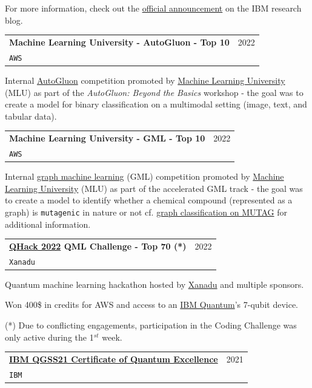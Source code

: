 \documentclass[letterpaper,11pt]{article}
\makeatletter
\newcommand{\resumeSubheading}[4]{
  \vspace{-2pt}\item
    \begin{tabular*}{0.97\textwidth}[t]{l@{\extracolsep{\fill}}r}
      \textbf{#1} & #2 \\
      \texttt{\small#3} & \textit{\small #4} \\
    \end{tabular*}\vspace{-7pt}
}
\makeatother
\begin{document}
    For more information, check out the \href{https://research.ibm.com/blog/quantum-challenge-fall-2022}{official announcement} on the IBM research blog.
    \vspace{2mm}
    \resumeSubheading
      {Machine Learning University - AutoGluon - Top 10}{2022}
      {AWS}{}
    \vspace{3mm}
    
    Internal \href{https://auto.gluon.ai/stable/index.html}{AutoGluon} competition promoted by \href{https://aws.amazon.com/machine-learning/mlu/}{Machine Learning University} (MLU) as part of the \emph{AutoGluon: Beyond the Basics} workshop - the goal was to create a model for binary classification on a multimodal setting (image, text, and tabular data).
    
    \vspace{2mm}
    \resumeSubheading
      {Machine Learning University - GML - Top 10}{2022}
      {AWS}{}
    \vspace{3mm}
    
    Internal \href{https://web.stanford.edu/class/cs224w/}{graph machine learning} (GML) competition promoted by \href{https://aws.amazon.com/machine-learning/mlu/}{Machine Learning University} (MLU) as part of the accelerated GML track - the goal was to create a model to identify whether a chemical compound (represented as a graph) is \texttt{mutagenic} in nature or not cf. \href{https://paperswithcode.com/sota/graph-classification-on-mutag}{graph classification on MUTAG} for additional information.
    
    \vspace{2mm}
    \resumeSubheading
      {\href{https://qhack.ai/}{QHack 2022} QML Challenge - Top 70 (*)}{2022}
      {Xanadu}{}
    \vspace{3mm}
    
    Quantum machine learning hackathon hosted by \href{https://www.xanadu.ai/}{Xanadu} and multiple sponsors.
    
    Won 400\$ in credits for AWS and access to an \href{https://www.ibm.com/quantum-computing/systems/}{IBM Quantum}'s 7-qubit device.
    
    {\tiny (*) Due to conflicting engagements, participation in the Coding Challenge was only active during the 1$^{st}$ week.}
    
    \vspace{2mm}
    \resumeSubheading
      {\href{https://qiskit.org/events/summer-school/}{IBM QGSS21 Certificate of Quantum Excellence}}{2021}
      {IBM}{}
    \vspace{3mm}
    
\end{document}

